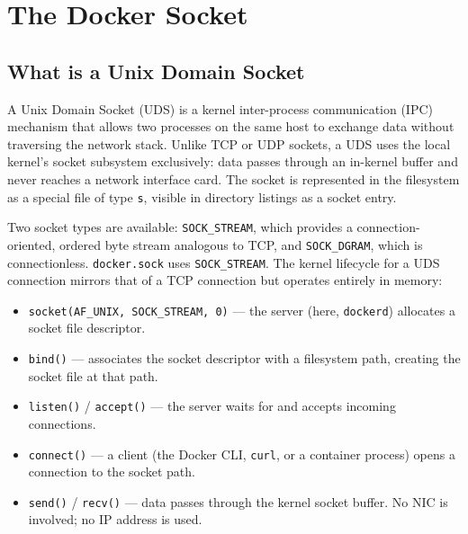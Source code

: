 
\chapter{The Docker Socket}

\section{What is a Unix Domain Socket}

A Unix Domain Socket (UDS) is a kernel inter-process communication (IPC) mechanism
that allows two processes on the same host to exchange data without traversing the
network stack. Unlike TCP or UDP sockets, a UDS uses the local kernel's socket
subsystem exclusively: data passes through an in-kernel buffer and never reaches a
network interface card. The socket is represented in the filesystem as a special file
of type \texttt{s}, visible in directory listings as a socket entry.

Two socket types are available: \texttt{SOCK\_STREAM}, which provides a
connection-oriented, ordered byte stream analogous to TCP, and \texttt{SOCK\_DGRAM},
which is connectionless. \texttt{docker.sock} uses \texttt{SOCK\_STREAM}. The kernel
lifecycle for a UDS connection mirrors that of a TCP connection but operates
entirely in memory:

\begin{itemize}
    \item \texttt{socket(AF\_UNIX, SOCK\_STREAM, 0)} --- the server (here,
          \texttt{dockerd}) allocates a socket file descriptor.
    \item \texttt{bind()} --- associates the socket descriptor with a filesystem path,
          creating the socket file at that path.
    \item \texttt{listen()} / \texttt{accept()} --- the server waits for and accepts
          incoming connections.
    \item \texttt{connect()} --- a client (the Docker CLI, \texttt{curl}, or a
          container process) opens a connection to the socket path.
    \item \texttt{send()} / \texttt{recv()} --- data passes through the kernel socket
          buffer. No NIC is involved; no IP address is used.
\end{itemize}


